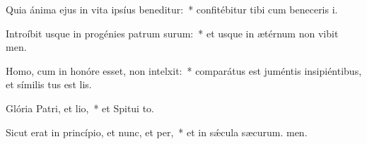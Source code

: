 \item Quia ánima ejus in vita ipsíus beneditur:~* confitébitur tibi cum beneceris i.
\item Introíbit usque in progénies patrum surum:~* et usque in ætérnum non vibit men.
\item Homo, cum in honóre esset, non intelxit:~* comparátus est juméntis insipiéntibus, et símilis tus est lis.
\item Glória Patri, et lio,~* et Spitui to.
\item Sicut erat in princípio, et nunc, et per,~* et in sǽcula sæcurum. men.
